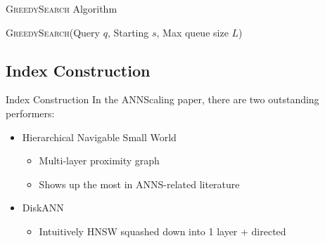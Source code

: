\begin{frame}{\textsc{GreedySearch} Algorithm}
    \begin{algorithm}[H]
        \caption{\textsc{GreedySearch}(Query \(q\), Starting \(s\), Max queue size \(L\))}\label{alg:greedy-search}
        \begin{algorithmic}[1]
                \EndIf
            \EndWhile
        \end{algorithmic}
    \end{algorithm}
\end{frame}

\subsection{Index Construction}

\begin{frame}{Index Construction}
    In the ANNScaling paper, there are two outstanding performers:
    \begin{itemize}
        \item Hierarchical Navigable Small World
            \begin{itemize}
                \item Multi-layer proximity graph
                \item Shows up the most in ANNS-related literature
            \end{itemize}
        \item DiskANN
            \begin{itemize}
                \item Intuitively HNSW squashed down into 1 layer + directed
            \end{itemize}
    \end{itemize}
\end{frame}

